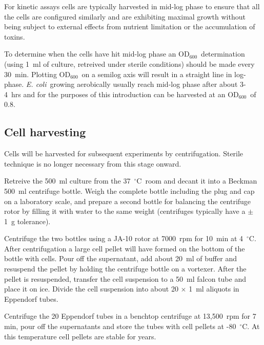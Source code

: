 \documentclass[a4paper]{article}
\newcommand{\dc}{~$^{\circ}$C}
\newcommand{\ec}{\textit{E. coli}}
\newcommand{\od}{OD$_{600}$}
\begin{document}
\begin{multicols}{2}
For kinetic assays cells are typically harvested in mid-log phase to ensure
that all the cells are configured similarly and are exhibiting maximal growth
without being subject to external effects from nutrient limitation or the
accumulation of toxins.

To determine when the cells have hit mid-log phase an \od\ determination (using
1~ml of culture, retreived under sterile conditions) should be made every
30~min. Plotting \od\ on a semilog axis will result in a straight line in
log-phase. \ec\ growing aerobically usually reach mid-log phase after about
3-4~hrs and for the purposes of this introduction can be harvested at an \od\
of 0.8.

\subsection{Cell harvesting} Cells will be harvested for subsequent experiments
by centrifugation. Sterile technique is no longer necessary from this stage
onward.

Retreive the 500~ml culture from the 37\dc\ room and decant it into a Beckman
500~ml centrifuge bottle. Weigh the complete bottle including the plug and cap
on a laboratory scale, and prepare a second bottle for balancing the centrifuge
rotor by filling it with water to the same weight (centrifuges typically have a
$\pm$1~g tolerance).

Centrifuge the two bottles using a JA-10 rotor at 7000~rpm for 10~min at 4\dc.
After centrifugation a large cell pellet will have formed on the bottom of the
bottle with cells. Pour off the supernatant, add about 20~ml of buffer and
resuspend the pellet by holding the centrifuge bottle on a vortexer. After the
pellet is resuspended, transfer the cell suspension to a 50~ml falcon tube and
place it on ice. Divide the cell suspension into about 20 $\times$ 1~ml
aliquots in Eppendorf tubes.

Centrifuge the 20 Eppendorf tubes in a benchtop centrifuge at 13,500~rpm for 7
min, pour off the supernatants and store the tubes with cell pellets at -80\dc.
At this temperature cell pellets are stable for years.





\end{multicols} 
\end{document}
